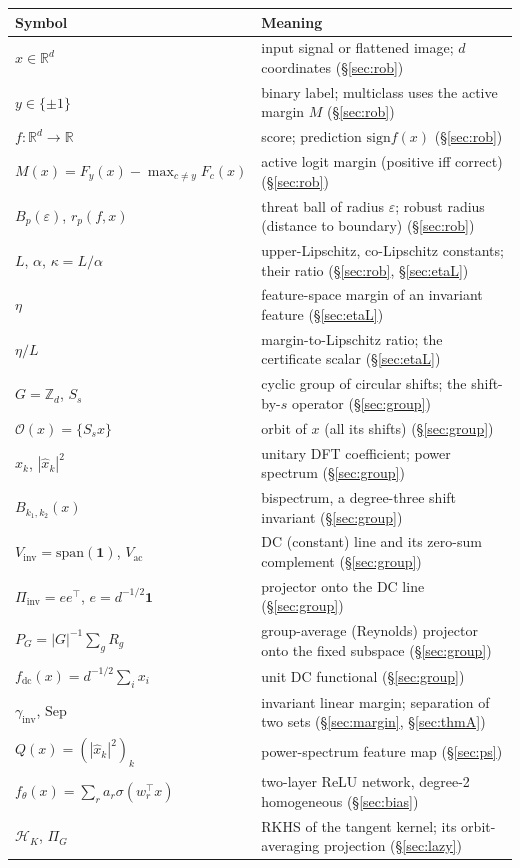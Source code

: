 \documentclass[11pt]{article}
\theoremstyle{plain}
\theoremstyle{definition}
\theoremstyle{remark}
\newcommand{\R}{\mathbb{R}}
\newcommand{\Z}{\mathbb{Z}}
\newcommand{\fdc}{f_{\mathrm{dc}}}
\newcommand{\Vinv}{V_{\mathrm{inv}}}
\newcommand{\Vac}{V_{\mathrm{ac}}}
\newcommand{\Sep}{\mathrm{Sep}}
\newcommand{\one}{\mathbf 1}
\newcommand{\Piinv}{\Pi_{\mathrm{inv}}}
\newcommand{\sign}{\mathrm{sign}}
\newcommand{\Orb}{\mathcal O}
\begin{document}
\begin{center}\small
\begin{tabular}{ll}
\toprule
Symbol & Meaning \\
\midrule
$x\in\R^d$ & input signal or flattened image; $d$ coordinates (\S\ref{sec:rob}) \\
$y\in\{\pm1\}$ & binary label; multiclass uses the active margin $M$ (\S\ref{sec:rob}) \\
$f:\R^d\to\R$ & score; prediction $\sign f(x)$ (\S\ref{sec:rob}) \\
$M(x)=F_y(x)-\max_{c\ne y}F_c(x)$ & active logit margin (positive iff correct) (\S\ref{sec:rob}) \\
$B_p(\varepsilon)$, $r_p(f,x)$ & threat ball of radius $\varepsilon$; robust radius (distance to boundary) (\S\ref{sec:rob}) \\
$L$, $\alpha$, $\kappa=L/\alpha$ & upper-Lipschitz, co-Lipschitz constants; their ratio (\S\ref{sec:rob}, \S\ref{sec:etaL}) \\
$\eta$ & feature-space margin of an invariant feature (\S\ref{sec:etaL}) \\
$\eta/L$ & margin-to-Lipschitz ratio; the certificate scalar (\S\ref{sec:etaL}) \\
$G=\Z_d$, $S_s$ & cyclic group of circular shifts; the shift-by-$s$ operator (\S\ref{sec:group}) \\
$\Orb(x)=\{S_sx\}$ & orbit of $x$ (all its shifts) (\S\ref{sec:group}) \\
$\hat x_k$, $|\hat x_k|^2$ & unitary DFT coefficient; power spectrum (\S\ref{sec:group}) \\
$B_{k_1,k_2}(x)$ & bispectrum, a degree-three shift invariant (\S\ref{sec:group}) \\
$\Vinv=\mathrm{span}(\one)$, $\Vac$ & DC (constant) line and its zero-sum complement (\S\ref{sec:group}) \\
$\Piinv=ee^\top$, $e=d^{-1/2}\one$ & projector onto the DC line (\S\ref{sec:group}) \\
$P_G=|G|^{-1}\sum_g R_g$ & group-average (Reynolds) projector onto the fixed subspace (\S\ref{sec:group}) \\
$\fdc(x)=d^{-1/2}\sum_i x_i$ & unit DC functional (\S\ref{sec:group}) \\
$\gamma_{\mathrm{inv}}$, $\Sep$ & invariant linear margin; separation of two sets (\S\ref{sec:margin}, \S\ref{sec:thmA}) \\
$Q(x)=(|\hat x_k|^2)_k$ & power-spectrum feature map (\S\ref{sec:ps}) \\
$f_\theta(x)=\sum_r a_r\sigma(w_r^\top x)$ & two-layer ReLU network, degree-2 homogeneous (\S\ref{sec:bias}) \\
$\mathcal H_K$, $\Pi_G$ & RKHS of the tangent kernel; its orbit-averaging projection (\S\ref{sec:lazy}) \\
\bottomrule
\end{tabular}
\end{center}
\end{document}

